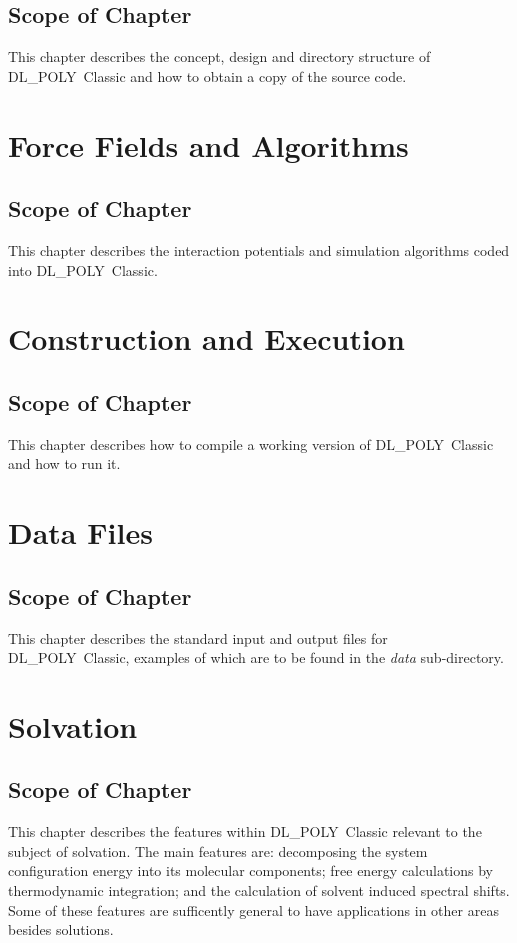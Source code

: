 \documentclass[11pt,a4paper,dvipdfmx]{report}
\newcommand{\D}{\mbox{DL\_POLY Classic}}
\begin{document}
\section*{Scope of Chapter}
This chapter describes the concept, design and directory structure
of \D{} and how to obtain a copy of the source code.
\newpage


\chapter{Force Fields and Algorithms}
\label{field}
\setcounter{equation}{0}
\newpage
\section*{Scope of Chapter}
This chapter describes the interaction potentials and simulation
algorithms coded into \D{}.
\newpage



\newpage
\chapter{Construction and Execution}
\label{conex}
\setcounter{equation}{0}
\newpage
\section*{Scope of Chapter}
This chapter describes how to compile a working version of \D{}
and how to run it.
\newpage




\newpage

\chapter{Data Files}
\label{files}
\setcounter{equation}{0}
\newpage
\section*{Scope of Chapter}
This chapter describes the standard input and output files for \D{},
examples of which are to be found in the {\em data} sub-directory.
\newpage

\newpage

\newpage

\chapter{Solvation}
\label{solvation}
\setcounter{equation}{0}
\newpage
\section*{Scope of Chapter}
This chapter describes the features within \D{} relevant to the subject of
solvation.  The main features are: decomposing the system configuration energy
into its molecular components; free energy calculations by thermodynamic
integration; and the calculation of solvent induced spectral shifts.  Some of
these features are sufficently general to have applications in other areas
besides solutions.
\newpage

\newpage
\end{document}
